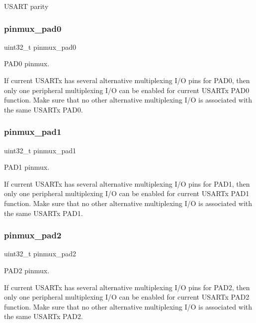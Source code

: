U\+S\+A\+RT parity \mbox{\label{structusart__config_a36c58e420cf9b44d2f6cc8042f81b5d6}} 
\subsubsection{\texorpdfstring{pinmux\_pad0}{pinmux\_pad0}}
{\footnotesize\ttfamily uint32\+\_\+t pinmux\+\_\+pad0}

P\+A\+D0 pinmux.

If current U\+S\+A\+R\+Tx has several alternative multiplexing I/O pins for P\+A\+D0, then only one peripheral multiplexing I/O can be enabled for current U\+S\+A\+R\+Tx P\+A\+D0 function. Make sure that no other alternative multiplexing I/O is associated with the same U\+S\+A\+R\+Tx P\+A\+D0. \mbox{\label{structusart__config_acbc2a9a6d4bee7422a98b6af97e470dc}} 
\subsubsection{\texorpdfstring{pinmux\_pad1}{pinmux\_pad1}}
{\footnotesize\ttfamily uint32\+\_\+t pinmux\+\_\+pad1}

P\+A\+D1 pinmux.

If current U\+S\+A\+R\+Tx has several alternative multiplexing I/O pins for P\+A\+D1, then only one peripheral multiplexing I/O can be enabled for current U\+S\+A\+R\+Tx P\+A\+D1 function. Make sure that no other alternative multiplexing I/O is associated with the same U\+S\+A\+R\+Tx P\+A\+D1. \mbox{\label{structusart__config_ac2961331910efba2dd3a1f865bb34e74}} 
\subsubsection{\texorpdfstring{pinmux\_pad2}{pinmux\_pad2}}
{\footnotesize\ttfamily uint32\+\_\+t pinmux\+\_\+pad2}

P\+A\+D2 pinmux.

If current U\+S\+A\+R\+Tx has several alternative multiplexing I/O pins for P\+A\+D2, then only one peripheral multiplexing I/O can be enabled for current U\+S\+A\+R\+Tx P\+A\+D2 function. Make sure that no other alternative multiplexing I/O is associated with the same U\+S\+A\+R\+Tx P\+A\+D2. \mbox{\label{structusart__config_aa0b3c5c2950e092fe55c7bc2fab47d75}} 
